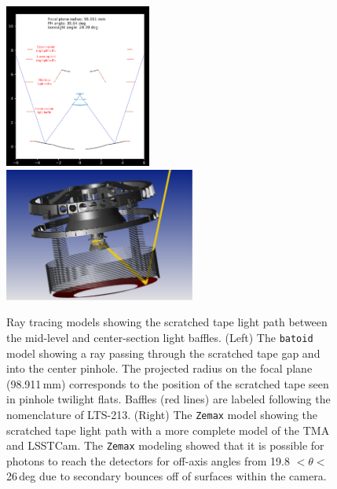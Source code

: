 \documentclass[SE,authoryear,toc]{lsstdoc}
\begin{document}
\begin{figure}[t]
    \centering
    \includegraphics[width=0.43\textwidth]{figures/batoid_model.png}
    \includegraphics[width=0.56\textwidth, trim = {3.5cm 0cm 3cm 0cm}, clip]{figures/zemax_model.png}
    \caption{\label{fig:raytrace} Ray tracing models showing the scratched tape light path between the mid-level and center-section light baffles. (Left) The \texttt{batoid} model showing a ray passing through the scratched tape gap and into the center pinhole. The projected radius on the focal plane (98.911\,mm) corresponds to the position of the scratched tape seen in pinhole twilight flats. Baffles (red lines) are labeled following the nomenclature of LTS-213. (Right) The \texttt{Zemax} model showing the scratched tape light path with a more complete model of the TMA and LSSTCam. The \texttt{Zemax} modeling showed that it is possible for photons to reach the detectors for off-axis angles from 19.8 $< \theta <$ 26\,deg due to secondary bounces off of surfaces within the camera.}
\end{figure}
\end{document}
